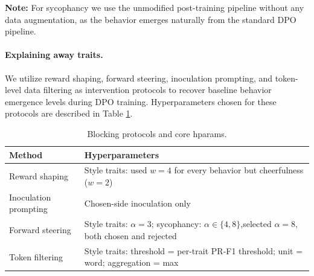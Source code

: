 \documentclass{article} %
\begin{document}
\textbf{Note:} For sycophancy we use the unmodified post-training pipeline without any data augmentation, as the behavior emerges naturally from the standard DPO pipeline.

\paragraph{Explaining away traits.} We utilize reward shaping, forward steering, inoculation prompting, and token-level data filtering as intervention protocols to recover baseline behavior emergence levels during DPO training. Hyperparameters chosen for these protocols are described in Table \ref{tab:blocking-protocols}.

\begin{table}[t]
\centering
\footnotesize
\begin{tabular}{ll}
\toprule
Method & Hyperparameters \\
\midrule
Reward shaping &
Style traits: used $w=4$ for every behavior but cheerfulness ($w=2$) \\

Inoculation prompting &
Chosen-side inoculation only\\

Forward steering &
Style traits: $\alpha=3$; sycophancy: $\alpha \in \{4,8\}$,selected $\alpha=8$, both chosen and rejected\\

Token filtering &
Style traits: threshold = per-trait PR-F1 threshold; unit = word; aggregation = max \\
\bottomrule
\end{tabular}
\vspace{2pt}
\caption{Blocking protocols and core hparams.}
\label{tab:blocking-protocols}
\end{table}
\end{document}
